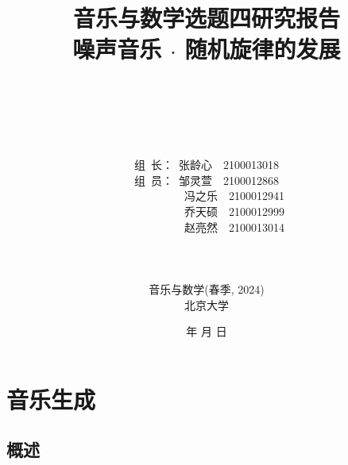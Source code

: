\documentclass[a4paper,12pt]{article} %
\begin{document}
\renewcommand{\contentsname}{目\ 录}
\renewcommand{\appendixname}{附录}
\renewcommand{\appendixpagename}{附录}
\renewcommand{\refname}{参考文献} 
\renewcommand{\figurename}{图}
\renewcommand{\tablename}{表}
\renewcommand{\today}{\number\year 年 \number\month 月 \number\day 日}

\title{\textbf{{\Huge 音乐与数学选题四研究报告{\large\linebreak\\}}}\textbf{{\Large 噪声音乐 $\cdot$ 随机旋律的发展
 \linebreak\linebreak}}}
\author{ 
\\ 
\\
\\
\\
\\
组\ 长：\ 
张龄心\ \ 2100013018
\\组\ 员：\ 
邹灵萱\ \ 2100012868
\\ \ \ \ \ \ \ \ \ \ \ 冯之乐\ \ 2100012941
\\ \ \ \ \ \ \ \ \ \ \ 乔天硕\ \ 2100012999
\\ \ \ \ \ \ \ \ \ \ \ 赵亮然\ \ 2100013014
\\ 
\\
\\
\\
音乐与数学(春季, 2024)\\
北京大学\\
}
\date{\today}
\maketitle
\newpage

\begin{center}
\tableofcontents\label{c}
\end{center}
\newpage



\section{音乐生成} \label{overview}%
\subsection{概述}
\end{document}
